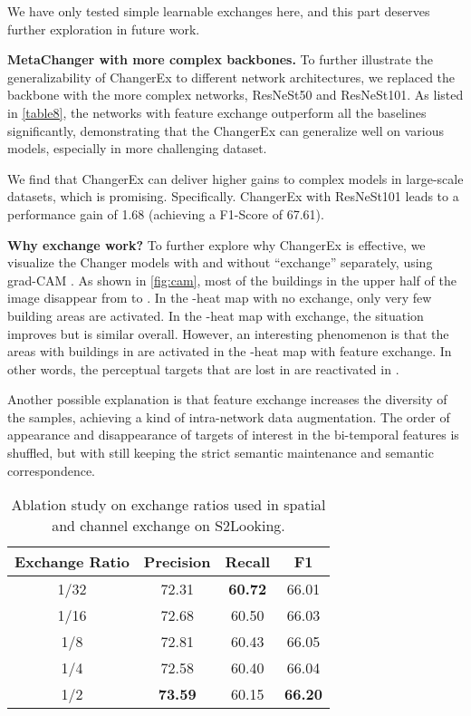 \documentclass[10pt,twocolumn,letterpaper]{article}
\begin{document}
We have only tested simple learnable exchanges here, and this part deserves further exploration in future work.

\textbf{MetaChanger with more complex backbones.} To further illustrate the generalizability of ChangerEx to different network architectures, we replaced the backbone with the more complex networks, ResNeSt50 and ResNeSt101. As listed in \cref{table8}, the networks with feature exchange outperform all the baselines significantly, demonstrating that the ChangerEx can generalize well on various models, especially in more challenging dataset.

We find that ChangerEx can deliver higher gains to complex models in large-scale datasets, which is promising. Specifically. ChangerEx with ResNeSt101 leads to a performance gain of 1.68 (achieving a F1-Score of 67.61).

\textbf{Why exchange work?} To further explore why ChangerEx is effective, we visualize the Changer models with and without ``exchange'' separately, using grad-CAM \cite{selvaraju2017grad}. As shown in \cref{fig:cam}, most of the buildings in the upper half of the image disappear from  to . In the -heat map with no exchange, only very few building areas are activated. In the -heat map with exchange, the situation improves but is similar overall. However, an interesting phenomenon is that the areas with buildings in  are activated in the -heat map with feature exchange. In other words, the perceptual targets that are lost in  are reactivated in .

Another possible explanation is that feature exchange increases the diversity of the samples, achieving a kind of intra-network data augmentation. The order of appearance and disappearance of targets of interest in the bi-temporal features is shuffled, but with still keeping the strict semantic maintenance and semantic correspondence.



\begin{table}
  \centering
  \begin{tabular}{@{}c|ccc@{}}
    \toprule[1pt]
    Exchange Ratio & Precision & Recall & F1 \\
    \midrule
    1/32 & 72.31 & \textbf{60.72} & 66.01 \\
    1/16 & 72.68 & 60.50 & 66.03 \\
    1/8 & 72.81 & 60.43 & 66.05 \\
    1/4 & 72.58 & 60.40 & 66.04 \\
    1/2 & \textbf{73.59} & 60.15 & \textbf{66.20} \\
    \bottomrule[1pt]
  \end{tabular}
  \caption{Ablation study on exchange ratios used in spatial and channel exchange on S2Looking.}
  \label{table5}
\end{table}
\end{document}
